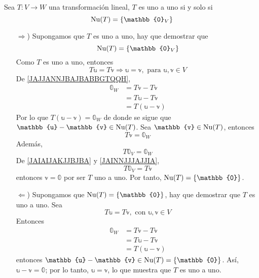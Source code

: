 \begin{theorem}\label{theo:nu_cero}
    Sea $T:V \longrightarrow W$ una transformación lineal, $T$ es uno a uno si y solo si
    $$\Nuc(T) = \{ \mathbb{0}_V \}$$
    \demostracion
    \begin{enumerate}
        \item[$\bm{\Rightarrow}$)] Supongamos que $T$ es uno a uno, hay que demostrar que
        $$\Nuc(T) = \{ \mathbb{0}_V \}$$
        Como $T$ es uno a uno, entonces
        \begin{equation}
            T\mathbb{u} = T\mathbb{v} \Longrightarrow \mathbb{u} = \mathbb{v}, \text{ para } \mathbb{u},  \mathbb{v} \in V \label{JAJJANNJBAJBABBGTQQH}
        \end{equation}
        De \eqref{JAJJANNJBAJBABBGTQQH},
        \begin{align*}
            \mathbb{0}_W & = T\mathbb{v} - T\mathbb{v} \\
            & = T\mathbb{u} - T\mathbb{v} \\
            & = T(\mathbb{u} - \mathbb{v})
        \end{align*}
        Por lo que $T(\mathbb{u} - \mathbb{v}) = \mathbb{0}_W$ de donde se sigue que $\mathbb{u} - \mathbb{v} \in \Nuc(T)$. Sea $\mathbb{v} \in \Nuc(T)$, entonces
        \begin{equation}
            T\mathbb{v} = \mathbb{0}_W \label{JAIAIJAKJJBJBA}
        \end{equation}
        Además,
        \begin{equation}
            T\mathbb{0}_V = \mathbb{0}_W \label{JAINNJJJAJJIA}
        \end{equation}
        De \eqref{JAIAIJAKJJBJBA} y \eqref{JAINNJJJAJJIA},
        $$T\mathbb{0}_V = T\mathbb{v}$$
        entonces $\mathbb{v} = \mathbb{0}$ por ser $T$ uno a uno. Por tanto, $\Nuc(T) = \{ \mathbb{0} \}$.
        \item[$\bm{\Leftarrow}$)] Supongamos que $\Nuc(T) = \{ \mathbb{0} \}$, hay que demostrar que $T$ es uno a uno. Sea
        $$T\mathbb{u} = T\mathbb{v}, \text{ con } \mathbb{u},  \mathbb{v} \in V$$
        Entonces
        \begin{align*}
            \mathbb{0}_W & = T\mathbb{v} - T\mathbb{v} \\
            & = T\mathbb{u} - T\mathbb{v} \\
            & = T(\mathbb{u} - \mathbb{v})
        \end{align*}
        entonces $\mathbb{u} - \mathbb{v} \in \Nuc(T) = \{ \mathbb{0} \}$. Así, $\mathbb{u} - \mathbb{v} = \mathbb{0}$; por lo tanto, $\mathbb{u} = \mathbb{v}$, lo que muestra que $T$ es uno a uno.
    \end{enumerate}
\end{theorem}


